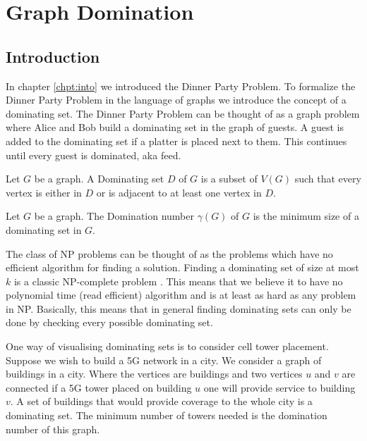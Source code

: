 \chapter{Graph Domination}\label{chpt:domSet}

\section{Introduction}

In chapter \ref{chpt:into} we introduced the Dinner Party Problem. To formalize the Dinner Party Problem in the language of graphs we introduce the concept of a dominating set. The Dinner Party Problem  can be thought of as  a graph problem where Alice and Bob build a dominating set in the graph of guests. A guest is added to the dominating set if a platter is placed next to them. This continues until every guest is dominated, aka feed. 

\begin{definition}
    Let $G$ be a graph. A Dominating set $D$ of $G$ is a subset of $V(G)$ such that every vertex is either in $D$ or is adjacent to at least one vertex in $D$.
\end{definition} 
\begin{definition}
    Let $G$ be a graph. The Domination number $\gamma(G)$ of $G$ is the minimum size of a dominating set in $G$.
\end{definition}

The class of NP problems can be thought of as the problems which have no efficient algorithm for finding a solution. 
Finding a dominating set of size at most $k$ is a classic NP-complete problem \cite[p.~190]{garey1979computers}. This means that we believe it to have no polynomial time (read efficient) algorithm and is at least as hard as any problem in NP. Basically, this means that in general finding dominating sets can only be done by checking every possible dominating set.

One way of visualising dominating sets is to consider cell tower placement. Suppose we wish to build a 5G network in a city. We consider a graph of buildings in a city. Where the vertices are buildings and two vertices $u$ and $v$ are connected if a 5G tower placed on building $u$ one will provide service to building $v$. A set of buildings that would provide coverage to the whole city is a dominating set. The minimum number of towers needed is the domination number of this graph.

